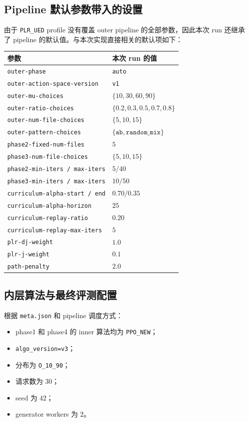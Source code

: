 \documentclass[11pt,a4paper]{ctexart}
\begin{document}
\subsection{Pipeline 默认参数带入的设置}
由于 \texttt{PLR\_UED} profile 没有覆盖 outer pipeline 的全部参数，因此本次 run 还继承了 pipeline 的默认值。与本次实现直接相关的默认项如下：
\begin{center}
\begin{tabular}{p{5.0cm}p{7.5cm}}
\toprule
参数 & 本次 run 的值 \\
\midrule
\texttt{outer-phase} & \texttt{auto} \\
\texttt{outer-action-space-version} & \texttt{v1} \\
\texttt{outer-mu-choices} & \(\{10,30,60,90\}\) \\
\texttt{outer-ratio-choices} & \(\{0.2,0.3,0.5,0.7,0.8\}\) \\
\texttt{outer-num-file-choices} & \(\{5,10,15\}\) \\
\texttt{outer-pattern-choices} & \(\{\texttt{ab},\texttt{random\_mix}\}\) \\
\texttt{phase2-fixed-num-files} & \(5\) \\
\texttt{phase3-num-file-choices} & \(\{5,10,15\}\) \\
\texttt{phase2-min-iters / max-iters} & \(5 / 40\) \\
\texttt{phase3-min-iters / max-iters} & \(10 / 50\) \\
\texttt{curriculum-alpha-start / end} & \(0.70 / 0.35\) \\
\texttt{curriculum-alpha-horizon} & \(25\) \\
\texttt{curriculum-replay-ratio} & \(0.20\) \\
\texttt{curriculum-replay-max-iters} & \(5\) \\
\texttt{plr-dj-weight} & \(1.0\) \\
\texttt{plr-j-weight} & \(0.1\) \\
\texttt{path-penalty} & \(2.0\) \\
\bottomrule
\end{tabular}
\end{center}

\subsection{内层算法与最终评测配置}
根据 \texttt{meta.json} 和 pipeline 调度方式：
\begin{itemize}[leftmargin=2.2em,itemsep=0.2em]
    \item phase1 和 phase4 的 inner 算法均为 \texttt{PPO\_NEW}；
    \item \texttt{algo\_version=v3}；
    \item 分布为 \texttt{O\_10\_90}；
    \item 请求数为 \(30\)；
    \item seed 为 \(42\)；
    \item generator workers 为 \(2\)。
\end{itemize}
\end{document}
